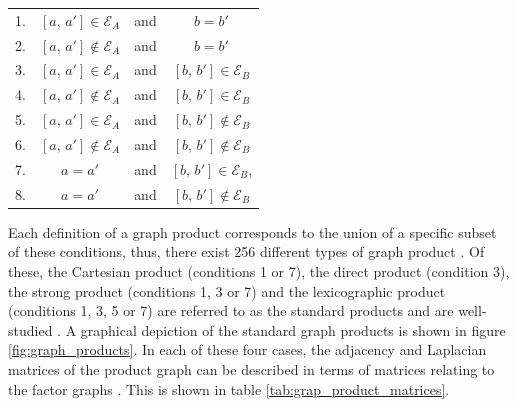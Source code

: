 \begin{table}[h]
    \def\arraystretch{1.5}
    \centering
    \begin{tabular}{lclc}
        1. & $[a, \, a'] \in \mathcal{E}_A$    & and & $b = b'$                          \\
        2. & $[a, \, a'] \notin \mathcal{E}_A$ & and & $b = b'$                          \\
        3. & $[a, \, a'] \in \mathcal{E}_A$    & and & $[b, \, b'] \in \mathcal{E}_B$    \\
        4. & $[a, \, a'] \notin \mathcal{E}_A$ & and & $[b, \, b'] \in \mathcal{E}_B$    \\
        5. & $[a, \, a'] \in \mathcal{E}_A$    & and & $[b, \, b'] \notin \mathcal{E}_B$ \\
        6. & $[a, \, a'] \notin \mathcal{E}_A$ & and & $[b, \, b'] \notin \mathcal{E}_B$ \\
        7. & $a = a'$                          & and & $[b, \, b'] \in \mathcal{E}_B$,   \\
        8. & $a = a'$                          & and & $[b, \, b'] \notin \mathcal{E}_B$
    \end{tabular}
\end{table}



Each definition of a graph product corresponds to the union of a specific subset of these conditions, thus, there exist 256 different types of graph product \citep{Barik2015}. Of these, the Cartesian product (conditions 1 or 7), the direct product (condition 3), the strong product (conditions 1, 3 or 7) and the lexicographic product (conditions 1, 3, 5 or 7) are referred to as the standard products and are well-studied \citep{Imrich2000}. A graphical depiction of the standard graph products is shown in figure \ref{fig:graph_products}. In each of these four cases, the adjacency and Laplacian matrices of the product graph can be described in terms of matrices relating to the factor graphs \citep{Fiedler1973, Barik2018}. This is shown in table \ref{tab:grap_product_matrices}.

